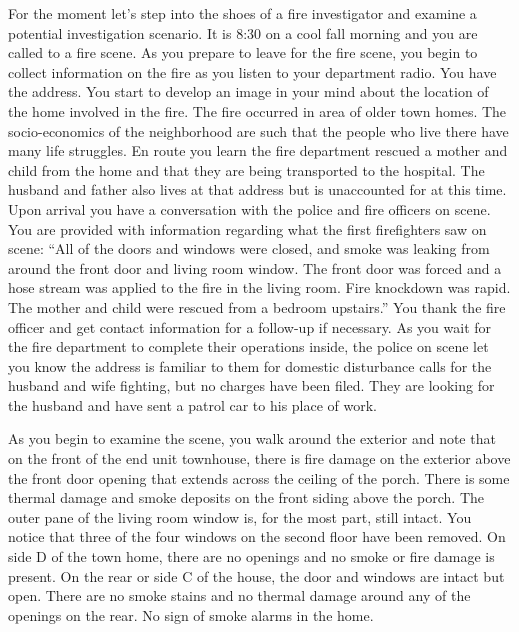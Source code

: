 \documentclass[twoside]{uocthesis}
\begin{document}
{For the moment let's step into the shoes of a fire investigator and examine a potential investigation scenario.  It is 8:30 on a cool fall morning and you are called to a fire scene.  As you prepare to leave for the fire scene, you begin to collect information on the fire as you listen to your department radio.  You have the address.  You start to develop an image in your mind about the location of the home involved in the fire. The fire occurred in area of older town homes.  The socio-economics of the neighborhood are such that the people who live there have many life struggles. En route you learn the fire department rescued a mother and child from the home and that they are being transported to the hospital.  The husband and father also lives at that address but is unaccounted for at this time.  Upon arrival you have a conversation with the police and fire officers on scene.  You are provided with information regarding what the first firefighters saw on scene: ``All of the doors and windows were closed, and smoke was leaking from around the front door and living room window.  The front door was forced and a hose stream was applied to the fire in the living room.  Fire knockdown was rapid.  The mother and child were rescued from a bedroom upstairs.'' You thank the fire officer and get contact information for a follow-up if necessary.  As you wait for the fire department to complete their operations inside, the police on scene let you know the address is familiar to them for domestic disturbance calls for the husband and wife fighting, but no charges have been filed.  They are looking for the husband and have sent a patrol car to his place of work.  

As you begin to examine the scene, you walk around the exterior and note that on the front of the end unit townhouse, there is fire damage on the exterior above the front door opening that extends across the ceiling of the porch.  There is some thermal damage and smoke deposits on the front siding above the porch.  The outer pane of the living room window is, for the most part, still intact. You notice that three of the four windows on the second floor have been removed.  On side D of the town home, there are no openings and no smoke or fire damage is present.  On the rear or side C of the house, the door and windows are intact but open.  There are no smoke stains and no thermal damage around any of the openings on the rear. No sign of smoke alarms in the home. 

}
\end{document}
